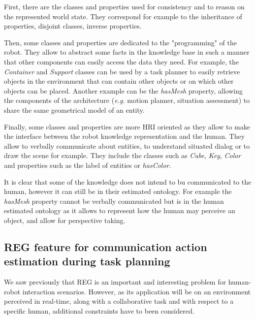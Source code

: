 \documentclass[a4paper,11pt,twoside]{StyleThese}
\begin{document}
First, there are the classes and properties used for consistency and to reason on the represented world state. They correspond for example to the inheritance of properties, disjoint classes, inverse properties. 

Then, some classes and properties are dedicated to the "programming" of the robot. They allow to abstract some facts in the knowledge base in such a manner that other components can easily access the data they need. For example, the \textit{Container} and \textit{Support} classes can be used by a task planner to easily retrieve objects in the environment that can contain other objects or on which other objects can be placed. Another example can be the \textit{hasMesh} property, allowing the components of the architecture (\textit{e.g.} motion planner, situation assessment) to share the same geometrical model of an entity.

Finally, some classes and properties are more HRI oriented as they allow to make the interface between the robot knowledge representation and the human. They allow to verbally communicate about entities, to understand situated dialog or to draw the scene for example. They include the classes such as \textit{Cube}, \textit{Key}, \textit{Color} and properties such as the label of entities or \textit{hasColor}.

It is clear that some of the knowledge does not intend to bu communicated to the human, however it can still be in their estimated ontology. For example the \textit{hasMesh} property cannot be verbally communicated but is in the human estimated ontology as it allows to represent how the human may perceive an object, and allow for perspective taking.


\subsection{REG feature for communication action estimation during task planning}
We saw previously that REG is an important and interesting problem for human-robot interaction scenarios. However, as its application will be on an environment perceived in real-time, along with a collaborative task and with respect to a specific human, additional constraints have to been considered.
\end{document}
